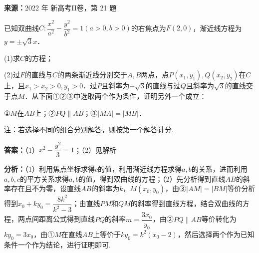\begin{question}[points=12]
\textbf{来源：}2022 年 新高考II卷，第 21 题\par
已知双曲线$C:\dfrac{x^2}{a^2}-\dfrac{y^2}{b^2}=1(a>0,b>0)$的右焦点为$F(2,0)$，渐近线方程为$y=\pm\sqrt{3}x$．

(1)求$C$的方程；

(2)过$F$的直线与$C$的两条渐近线分别交于$A,B$两点，点$P(x_1,y_1),Q(x_2,y_2)$在$C$上，且$x_1>x_2>0,y_1>0$．过$P$且斜率为$-\sqrt{3}$的直线与过$Q$且斜率为$\sqrt{3}$的直线交于点$M$．从下面①②③中选取两个作为条件，证明另外一个成立：

①$M$在$AB$上；②$PQ\parallel AB$；③$|MA|=|MB|$．

注：若选择不同的组合分别解答，则按第一个解答计分.
\begin{solution}
\textbf{答案：}（1）$x^2-\dfrac{y^2}{3}=1$；（2）见解析

\textbf{分析：}（1）利用焦点坐标求得$c$的值，利用渐近线方程求得$a,b$的关系，进而利用$a,b,c$的平方关系求得$a,b$的值，得到双曲线的方程；（2）先分析得到直线$AB$的斜率存在且不为零，设直线$AB$的斜率为$k$，$M(x_0,y_0)$，由③$|AM|=|BM|$等价分析得到$x_0+ky_0=\dfrac{8k^2}{k^2-3}$；由直线$PM$和$QM$的斜率得到直线方程，结合双曲线的方程，两点间距离公式得到直线$PQ$的斜率$m=\dfrac{3x_0}{y_0}$，由②$PQ\parallel AB$等价转化为$ky_0=3x_0$，由①$M$在直线$AB$上等价于$ky_0=k^2(x_0-2)$，然后选择两个作为已知条件一个作为结论，进行证明即可.


\end{solution}
\end{question}
